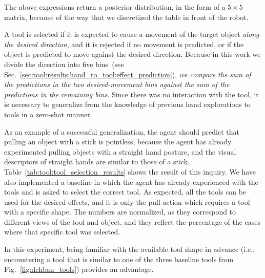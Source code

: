 The above expressions return a posterior distribution, in the form of a $5 \times 5$ matrix, because of the way that we discretized the table in front of the robot.

A tool is selected if it is expected to cause a movement of the target object \emph{along the desired direction}, and it is rejected if no movement is predicted, or if the object is predicted to move against the desired direction.
Because in this work we divide the direction into five bins~(see Sec.~\ref{sec:tool:results:hand_to_tool:effect_prediction}), \emph{we compare the sum of the predictions in the two desired-movement bins against the sum of the predictions in the remaining bins}.
Since there was no interaction with the tool, it is necessary to generalize from the knowledge of previous hand explorations to tools in a zero-shot manner.

As an example of a successful generalization, the agent should predict that pulling an object with a stick is pointless, because the agent has already experimented pulling objects with a straight hand posture, and the visual descriptors of straight hands are similar to those of a stick.
Table~\ref{tab:tool:tool_selection_results} shows the result of this inquiry.
We have also implemented a baseline in which the agent has already experienced with the tools and is asked to select the correct tool.
As expected, all the tools can be used for the desired effects, and it is only the pull action which requires a tool with a specific shape.
The numbers are normalized, as they correspond to different views of the tool and object, and they reflect the percentage of the cases where that specific tool was selected.

In this experiment, being familiar with the available tool shape in advance (i.e., encountering a tool that is similar to one of the three baseline tools from Fig.~\ref{fig:dehban_tools}) provides an advantage.


